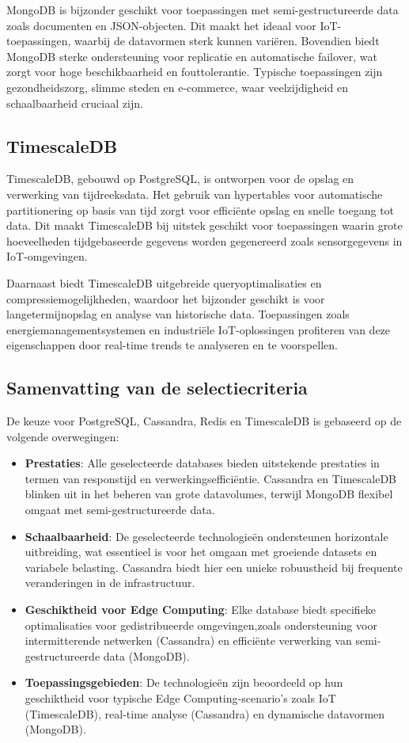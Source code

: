 MongoDB is bijzonder geschikt voor toepassingen met semi-gestructureerde data zoals documenten en JSON-objecten. Dit maakt het ideaal voor IoT-toepassingen, waarbij de datavormen sterk kunnen variëren. Bovendien biedt MongoDB sterke ondersteuning voor replicatie en automatische failover, wat zorgt voor hoge beschikbaarheid en fouttolerantie. Typische toepassingen zijn gezondheidszorg, slimme steden en e-commerce, waar veelzijdigheid en schaalbaarheid cruciaal zijn.

\subsection{TimescaleDB}
TimescaleDB, gebouwd op PostgreSQL, is ontworpen voor de opslag en verwerking van tijdreeksdata. Het gebruik van hypertables voor automatische partitionering op basis van tijd zorgt voor efficiënte opslag en snelle toegang tot data. Dit maakt TimescaleDB bij uitstek geschikt voor toepassingen waarin grote hoeveelheden tijdgebaseerde gegevens worden gegenereerd zoals sensorgegevens in IoT-omgevingen.

Daarnaast biedt TimescaleDB uitgebreide queryoptimalisaties en compressiemogelijkheden, waardoor het bijzonder geschikt is voor langetermijnopslag en analyse van historische data. Toepassingen zoals energiemanagementsystemen en industriële IoT-oplossingen profiteren van deze eigenschappen door real-time trends te analyseren en te voorspellen.

\subsection{Samenvatting van de selectiecriteria}
De keuze voor PostgreSQL, Cassandra, Redis en TimescaleDB is gebaseerd op de volgende overwegingen:
\begin{itemize}
    \item \textbf{Prestaties}: Alle geselecteerde databases bieden uitstekende prestaties in termen van responstijd en verwerkingsefficiëntie. Cassandra en TimescaleDB blinken uit in het beheren van grote datavolumes, terwijl MongoDB flexibel omgaat met semi-gestructureerde data.
    \item \textbf{Schaalbaarheid}: De geselecteerde technologieën ondersteunen horizontale uitbreiding, wat essentieel is voor het omgaan met groeiende datasets en variabele belasting. Cassandra biedt hier een unieke robuustheid bij frequente veranderingen in de infrastructuur.
    \item \textbf{Geschiktheid voor Edge Computing}: Elke database biedt specifieke optimalisaties voor gedistribueerde omgevingen,zoals ondersteuning voor intermitterende netwerken (Cassandra) en efficiënte verwerking van semi-gestructureerde data (MongoDB).
    \item \textbf{Toepassingsgebieden}: De technologieën zijn beoordeeld op hun geschiktheid voor typische Edge Computing-scenario's zoals IoT (TimescaleDB), real-time analyse (Cassandra) en dynamische datavormen (MongoDB).
\end{itemize}

